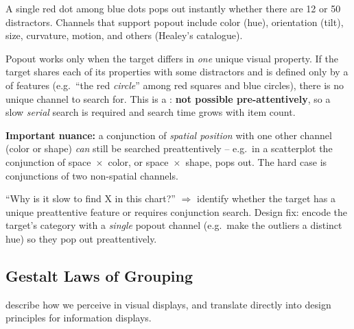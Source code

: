 A single red dot among blue dots pops out instantly whether there are 12 or 50
distractors. Channels that support popout include color (hue), orientation
(tilt), size, curvature, motion, and others (Healey's catalogue).

\begin{pitfall}
Popout works only when the target differs in \emph{one} unique visual property.
If the target shares each of its properties with some distractors and is
defined only by a  of features (e.g.\ ``the red \emph{circle}''
among red squares and blue circles), there is no unique channel to search for.
This is a : \textbf{not possible pre-attentively}, so
a slow \emph{serial} search is required and search time grows with item count.
\end{pitfall}

\textbf{Important nuance:} a conjunction of \emph{spatial position} with one
other channel (color or shape) \emph{can} still be searched preattentively --
e.g.\ in a scatterplot the conjunction of space~$\times$~color, or
space~$\times$~shape, pops out. The hard case is conjunctions of two
non-spatial channels.

\begin{exambox}
``Why is it slow to find X in this chart?'' $\Rightarrow$ identify whether the
target has a unique preattentive feature or requires conjunction search.
Design fix: encode the target's category with a \emph{single} popout channel
(e.g.\ make the outliers a distinct hue) so they pop out preattentively.
\end{exambox}

\subsection{Gestalt Laws of Grouping}

 describe how we perceive  in
visual displays, and translate directly into design principles for information
displays.

